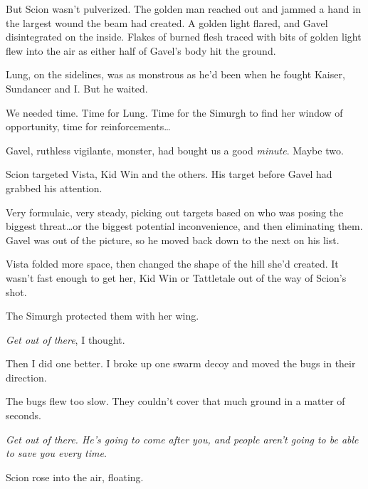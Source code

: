 But Scion wasn't pulverized.  The golden man reached out and jammed a hand in the largest wound the beam had created.  A golden light flared, and Gavel disintegrated on the inside.  Flakes of burned flesh traced with bits of golden light flew into the air as either half of Gavel's body hit the ground.



Lung, on the sidelines, was as monstrous as he'd been when he fought Kaiser, Sundancer and I.  But he waited.



We needed time.  Time for Lung.  Time for the Simurgh to find her window of opportunity, time for reinforcements\ldots



Gavel, ruthless vigilante, monster, had bought us a good \emph{minute}.  Maybe two.



Scion targeted Vista, Kid Win and the others.  His target before Gavel had grabbed his attention.



Very formulaic, very steady, picking out targets based on who was posing the biggest threat\ldots or the biggest potential inconvenience, and then eliminating them.  Gavel was out of the picture, so he moved back down to the next on his list.



Vista folded more space, then changed the shape of the hill she'd created.  It wasn't fast enough to get her, Kid Win or Tattletale out of the way of Scion's shot.



The Simurgh protected them with her wing.



\emph{Get out of there}, I thought.



Then I did one better.  I broke up one swarm decoy and moved the bugs in their direction.



The bugs flew too slow.  They couldn't cover that much ground in a matter of seconds.



\emph{Get out of there.  He's going to come after you, and people aren't going to be able to save you every time}.



Scion rose into the air, floating.



